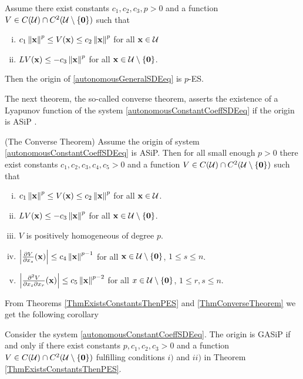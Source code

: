 \documentclass[a4paper,12pt,twoside,BCOR=10mm]{scrbook}
\begin{document}
\begin{theorem}\label{ThmExistsConstantsThenPES}
Assume there exist constants $c_1, c_2, c_3, p > 0$ and a function $V\in C(\mathcal{U})\cap C^2(\mathcal{U}\setminus \{\mathbf{0}\})$ such that
\begin{enumerate}[i)]
    \item $c_1\left\lVert\mathbf{x}\right\rVert^p \leq V(\mathbf{x}) \leq c_2\left\lVert\mathbf{x}\right\rVert^p$ for all $\mathbf{x} \in \mathcal{U}$
    \item $LV(\mathbf{x}) \leq -c_3\left\lVert\mathbf{x}\right\rVert^p$ for all $\mathbf{x} \in \mathcal{U} \setminus \{\mathbf{0}\}$.
\end{enumerate}
Then the origin of \eqref{autonomousGeneralSDEeq} is $p$-ES.
\end{theorem}

The next theorem, the so-called converse theorem, asserts the existence of a Lyapunov function of the system \eqref{autonomousConstantCoeffSDEeq} if the origin is ASiP \citep{HGGS2018localLya}.

\begin{theorem}(The Converse Theorem)\label{ThmConverseTheorem}
Assume the origin of system \eqref{autonomousConstantCoeffSDEeq} is ASiP. Then for all small enough $p > 0$ there exist constants $c_1,c_2,c_3,c_4,c_5 > 0$ and a function $V\in C(\mathcal{U})\cap C^2(\mathcal{U}\setminus \{\mathbf{0}\})$ such that
\begin{enumerate}[i)]
    \item $c_1\left\lVert\mathbf{x}\right\rVert_{}^{p} \leq V(\mathbf{x}) \leq c_2\left\lVert\mathbf{x}\right\rVert_{}^{p}$ for all $\mathbf{x} \in \mathcal{U}$.
    \item $LV(\mathbf{x}) \leq -c_3\left\lVert\mathbf{x}\right\rVert_{}^{p}$ for all $\mathbf{x} \in \mathcal{U}\setminus \{\mathbf{0}\}$.
    \item $V$ is positively homogeneous of degree $p$.
    \item $\left\lvert \frac{\partial V}{\partial x_s}(\mathbf{x})\right\rvert \leq c_4\left\lVert\mathbf{x}\right\rVert_{}^{p-1}$ for all $\mathbf{x}\in \mathcal{U}\setminus \{\mathbf{0}\}$, $1\leq s\leq n$.
    \item $\left\lvert \frac{\partial^2 V}{\partial x_s \partial x_r}(\mathbf{x})\right\rvert \leq c_5 \left\lVert\mathbf{x}\right\rVert_{}^{p - 2}$ for all $x\in\mathcal{U}\setminus \{\mathbf{0}\}$, $1\leq r,s\leq n$.
\end{enumerate}
\end{theorem}

From Theorems \ref{ThmExistsConstantsThenPES} and \ref{ThmConverseTheorem} we get the following corollary

\begin{corollary}
Consider the system \eqref{autonomousConstantCoeffSDEeq}. The origin is GASiP if and only if there exist constants $p, c_1,c_2,c_3 > 0$ and a function $V\in C(\mathcal{U})\cap C^2(\mathcal{U}\setminus \{\mathbf{0}\})$ fulfilling conditions $i)$ and $ii)$ in Theorem \ref{ThmExistsConstantsThenPES}.
\end{corollary}
\end{document}
